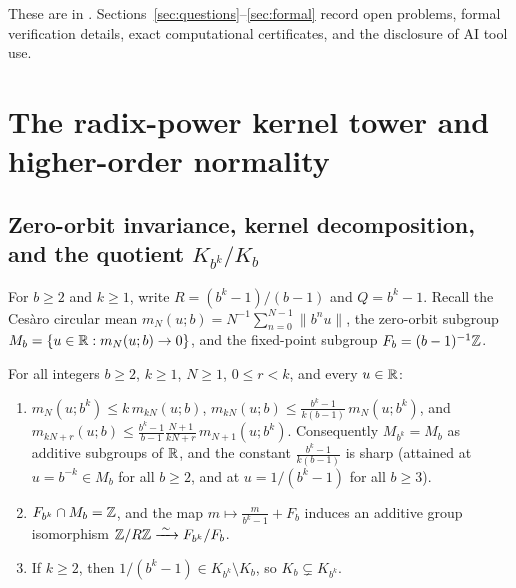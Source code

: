 \documentclass[11pt]{article}
\newcommand{\dist}[1]{\lVert #1\rVert}
\begin{document}
These are  in . Sections~\ref{sec:questions}--\ref{sec:formal} record open problems, formal verification details, exact computational certificates, and the disclosure of AI tool use.

\section{The radix-power kernel tower and higher-order normality}\label{sec:tower}

\subsection{Zero-orbit invariance, kernel decomposition, and the quotient $K_{b^k}/K_b$}

For $b\ge2$ and $k\ge1$, write $R=(b^k-1)/(b-1)$ and $Q=b^k-1$. Recall the Ces\`aro circular mean $m_N(u;b)=N^{-1}\sum_{n=0}^{N-1}\dist{b^nu}$, the zero-orbit subgroup $M_b=\{u\in\mathbb R:m_N(u;b)\to0\}$, and the fixed-point subgroup $F_b=(b-1)^{-1}\mathbb Z$.

\begin{theorem}\label{thm:zero-orbit-quotient}
For all integers $b\ge2$, $k\ge1$, $N\ge1$, $0\le r<k$, and every $u\in\mathbb R$:
\begin{enumerate}[label=\textup{(\roman*)},nosep]
\item $m_N(u;b^k)\le k\,m_{kN}(u;b)$, $m_{kN}(u;b)\le\frac{b^k-1}{k(b-1)}\,m_N(u;b^k)$, and $m_{kN+r}(u;b)\le\frac{b^k-1}{b-1}\frac{N+1}{kN+r}\,m_{N+1}(u;b^k)$. Consequently $M_{b^k}=M_b$ as additive subgroups of $\mathbb R$, and the constant $\frac{b^k-1}{k(b-1)}$ is sharp (attained at $u=b^{-k}\in M_b$ for all $b\ge2$, and at $u=1/(b^k-1)$ for all $b\ge3$).
\item $F_{b^k}\cap M_b=\mathbb Z$, and the map $m\mapsto \frac{m}{b^k-1}+F_b$ induces an additive group isomorphism $\mathbb Z/R\mathbb Z\xrightarrow{\;\sim\;} F_{b^k}/F_b$.
\item If $k\ge2$, then $1/(b^k-1)\in K_{b^k}\setminus K_b$, so $K_b\subsetneq K_{b^k}$.
\end{enumerate}
\end{theorem}
\end{document}
